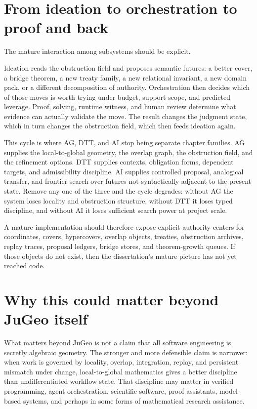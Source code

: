 \documentclass[11pt]{report}
\begin{document}
\section{From ideation to orchestration to proof and back}
The mature interaction among subsystems should be explicit.

Ideation reads the obstruction field and proposes semantic futures: a better cover, a bridge theorem, a new treaty family, a new relational invariant, a new domain pack, or a different decomposition of authority. Orchestration then decides which of those moves is worth trying under budget, support scope, and predicted leverage. Proof, solving, runtime witness, and human review determine what evidence can actually validate the move. The result changes the judgment state, which in turn changes the obstruction field, which then feeds ideation again.

This cycle is where AG, DTT, and AI stop being separate chapter families. AG supplies the local-to-global geometry, the overlap graph, the obstruction field, and the refinement options. DTT supplies contexts, obligation forms, dependent targets, and admissibility discipline. AI supplies controlled proposal, analogical transfer, and frontier search over futures not syntactically adjacent to the present state. Remove any one of the three and the cycle degrades: without AG the system loses locality and obstruction structure, without DTT it loses typed discipline, and without AI it loses sufficient search power at project scale.

A mature implementation should therefore expose explicit authority centers for coordinates, covers, hypercovers, overlap objects, treaties, obstruction archives, replay traces, proposal ledgers, bridge stores, and theorem-growth queues. If those objects do not exist, then the dissertation's mature picture has not yet reached code.

\section{Why this could matter beyond JuGeo itself}
What matters beyond JuGeo is not a claim that all software engineering is secretly algebraic geometry. The stronger and more defensible claim is narrower: when work is governed by locality, overlap, integration, replay, and persistent mismatch under change, local-to-global mathematics gives a better discipline than undifferentiated workflow state. That discipline may matter in verified programming, agent orchestration, scientific software, proof assistants, model-based systems, and perhaps in some forms of mathematical research assistance.
\end{document}
